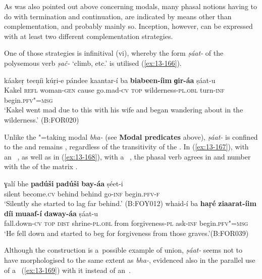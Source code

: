  As was also pointed out above concerning modals, many phasal notions having to do with termination and continuation, are indicated by means other than complementation, and probably mainly so. Inception, however, can be expressed with at least two different complementation strategies.


One of those strategies is infinitival (vi), whereby the  form \textit{ṣáat-} of the polysemous verb \textit{ṣač-} `climb, etc.' is utilised (\ref{ex:13-166}). 

\ea\label{ex:13-166}
\gll káakeṛ teeṇíi kúṛi-e pándee kaantar-í ba  \textbf{biabeen-íim} \textbf{ɡir-áa} ṣáat-u \\
Kakel \textsc{ refl} woman-\textsc{gen} cause go.mad-\textsc{cv} \textsc{top} wilderness-\textsc{pl.obl} turn-\textsc{inf} begin.\textsc{pfv"=msg} \\
\glt `Kakel went mad due to this with his wife and began wandering about in the wilderness.' (B:FOR020) 
\z

Unlike the "=taking modal \textit{bha-} (see \textbf{Modal predicates} above), \textit{ṣáat-} is confined to the  and remains , regardless of the transitivity of the  . In (\ref{ex:13-167}), with an~ , as well as in (\ref{ex:13-168}), with a~ , the phasal verb agrees in  and number with the  of the matrix .

\ea
\label{ex:13-167}
\gll ɣalí bhe \textbf{padúši} \textbf{padúši} \textbf{bay-áa} ṣéet-i  \\
silent become.\textsc{cv} behind behind go-\textsc{inf} begin.\textsc{pfv-f} \\
\glt `Silently she started to lag far behind.' (B:FOY012)
\ex
\label{ex:13-168}
\gll whaid-í ba \textbf{haṛé} \textbf{ziaarat-íim} \textbf{díi} \textbf{muaaf-í} \textbf{daway-áa} ṣáat-u\\
fall.down-\textsc{cv} \textsc{top} \textsc{dist} shrine-\textsc{pl.obl} from forgiveness-\textsc{pl} ask-\textsc{inf} begin.\textsc{pfv"=msg}\\
\glt `He fell down and started to beg for forgiveness from those graves.'\newline (B:FOR039) 
\z

Although the construction is a~possible example of  union, \textit{ṣáat-} seems not to have morphologised to the same extent as \textit{bha-}, evidenced also in the parallel use of a~ (\ref{ex:13-169}) with it instead of an~. 

